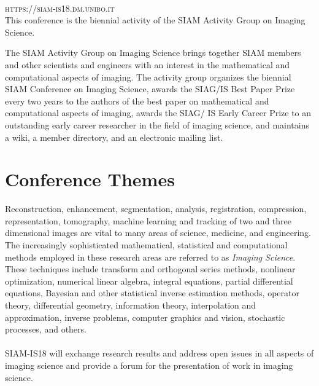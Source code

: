 
\newpage
~\vfill
\thispagestyle{empty}



\noindent \textsc{https://siam-is18.dm.unibo.it}\\ %

\noindent This conference is the biennial activity of the SIAM Activity Group on Imaging Science.\\\vspace{0.5cm}

The SIAM Activity Group on Imaging Science brings together SIAM members and other scientists and engineers with an interest in the mathematical and computational aspects of imaging.
The activity group organizes the biennial SIAM Conference on Imaging Science, awards the SIAG/IS Best Paper Prize
every two years to the authors of the best paper on mathematical and computational aspects of imaging, awards the SIAG/
IS Early Career Prize to an outstanding early career researcher in the field of imaging science, and maintains a wiki, a
member directory, and an electronic mailing list.


\newpage

\section*{Conference Themes}
\indent Reconstruction, enhancement, segmentation, analysis, registration, compression, representation, tomography, machine learning and tracking of two and three dimensional images are vital to many areas of science, medicine, and engineering. The increasingly sophisticated mathematical, statistical and computational methods employed in these research areas are referred to as \emph{Imaging Science}.\\ These techniques include transform and orthogonal series methods, nonlinear optimization, numerical linear algebra, integral equations, partial differential equations, Bayesian and other statistical inverse estimation methods, operator theory, differential geometry, information theory, interpolation and approximation, inverse problems, computer graphics and vision, stochastic processes, and others.\\\\
\indent SIAM-IS18 will exchange research results and address open issues in all aspects of imaging science
and provide a forum for the presentation of work in imaging science.


